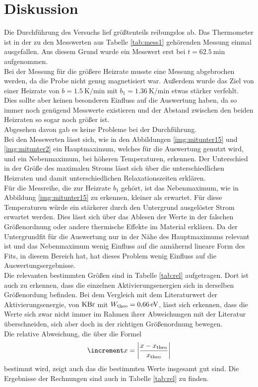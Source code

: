 \newpage
\section{Diskussion}

\noindent
Die Durchführung des Versuchs lief größtenteils reibungslos ab.
Das Thermometer ist in der zu den Messwerten aus Tabelle \ref{tab:mess1} gehörenden Messung einmal ausgefallen. Aus diesem Grund wurde ein Messwert erst bei $t = \SI{62.5}{\minute}$ aufgenommen.\\
Bei der Messung für die größere Heizrate musste eine Messung abgebrochen werden, da die Probe nicht genug magnetisiert war.
Außerdem wurde das Ziel von einer Heizrate von $b =\SI{1.5}{\kelvin\per\minute}$ mit $b_1 =\SI{1.36}{\kelvin\per\minute}$ etwas stärker verfehlt.
Dies sollte aber keinen besonderen Einfluss auf die Auswertung haben, da so immer noch genügend Messwerte existieren und der Abstand zwischen den beiden Heizraten so sogar noch größer ist.\\
Abgesehen davon gab es keine Probleme bei der Durchführung.\\

\noindent
Bei den Messwerten lässt sich, wie in den Abbildungen \ref{img:mitunter15} und \ref{img:mitunter2} ein Hauptmaximum, welches für die Auswertung genutzt wird, 
und ein Nebenmaximum, bei höheren Temperaturen, erkennen.
Der Unterschied in der Größe des maximalen Stroms lässt sich über die unterschiedlichen Heizraten und damit unterschiedlichen Relaxationszeiten erklären.\\
Für die Messreihe, die zur Heizrate $b_1$ gehört, ist das Nebenmaximum, wie in Abbildung \ref{img:mitunter15} zu erkennen, kleiner als erwartet. 
Für diese Temperaturen würde ein stärkerer durch den Untergrund ausgelöster Strom erwartet werden. 
Dies lässt sich über das Ablesen der Werte in der falschen Größenordnung oder andere thermische Effekte im Material erklären.
Da der Untergrundfit für die Auswertung nur in der Nähe des Hauptmaximums relevant ist und das Nebenmaximum wenig Einfluss auf die annähernd lineare Form des Fits, in diesem Bereich hat, hat dieses Problem wenig Einfluss auf die Auswertungsergebnisse.  \\
Die relevanten bestimmten Größen sind in Tabelle \ref{tab:rel} aufgetragen. 
Dort ist auch zu erkennen, dass die einzelnen Aktivierungsenergien sich in derselben Größenordung befinden. 
Bei dem Vergleich mit dem Literaturwert der Aktivierungsenergie, von $\ce{KBr}$ mit $W_{\text{theo}} = \SI{0.66}{\electronvolt}$\cite{lit}, 
lässt sich erkennen, dass die Werte sich zwar nicht immer im Rahmen ihrer Abweichungen mit der Literatur überschneiden, sich aber doch in der richtigen Größenordnung bewegen.\\
Die relative Abweichung, die über die Formel  
\begin{equation*}
    \increment x = \left| \frac{x - x_\t{theo}}{x_\t{theo}} \right|
\end{equation*}
bestimmt wird, zeigt auch das die bestimmten Werte insgesamt gut sind. Die Ergebnisse der Rechnungen sind auch in Tabelle \ref{tab:rel} zu finden.

